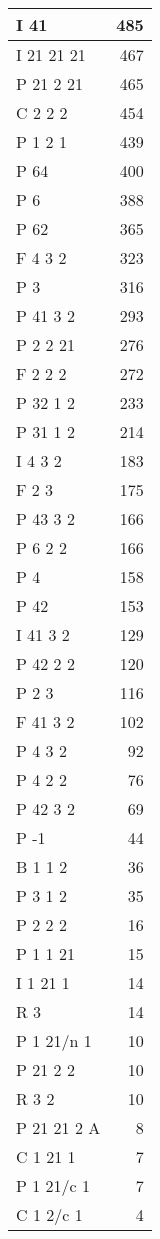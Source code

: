 \documentclass[
]{book}
\begin{document}
\begin{table}[H]
\begin{tabular}{l|r}
\hline
I 41 & 485\\
\hline
I 21 21 21 & 467\\
\hline
P 21 2 21 & 465\\
\hline
C 2 2 2 & 454\\
\hline
P 1 2 1 & 439\\
\hline
P 64 & 400\\
\hline
P 6 & 388\\
\hline
P 62 & 365\\
\hline
F 4 3 2 & 323\\
\hline
P 3 & 316\\
\hline
P 41 3 2 & 293\\
\hline
P 2 2 21 & 276\\
\hline
F 2 2 2 & 272\\
\hline
P 32 1 2 & 233\\
\hline
P 31 1 2 & 214\\
\hline
I 4 3 2 & 183\\
\hline
F 2 3 & 175\\
\hline
P 43 3 2 & 166\\
\hline
P 6 2 2 & 166\\
\hline
P 4 & 158\\
\hline
P 42 & 153\\
\hline
I 41 3 2 & 129\\
\hline
P 42 2 2 & 120\\
\hline
P 2 3 & 116\\
\hline
F 41 3 2 & 102\\
\hline
P 4 3 2 & 92\\
\hline
P 4 2 2 & 76\\
\hline
P 42 3 2 & 69\\
\hline
P -1 & 44\\
\hline
B 1 1 2 & 36\\
\hline
P 3 1 2 & 35\\
\hline
P 2 2 2 & 16\\
\hline
P 1 1 21 & 15\\
\hline
I 1 21 1 & 14\\
\hline
R 3 & 14\\
\hline
P 1 21/n 1 & 10\\
\hline
P 21 2 2 & 10\\
\hline
R 3 2 & 10\\
\hline
P 21 21 2 A & 8\\
\hline
C 1 21 1 & 7\\
\hline
P 1 21/c 1 & 7\\
\hline
C 1 2/c 1 & 4\\

\end{tabular}
\end{table}
\end{document}

